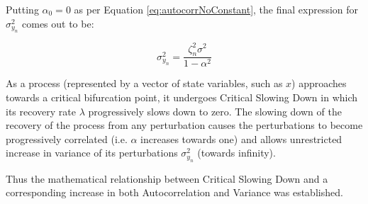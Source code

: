 Putting $\alpha_0 = 0$ as per Equation \ref{eq:autocorrNoConstant}, the final expression for $\sigma^2_{y_n}$ comes out to be:

\begin{equation}
	\label{eq:varianceFormulaNoConstant}
	\sigma^2_{y_n} = \frac{\zeta^2_{n}\sigma^2}{1-\alpha^2}
\end{equation}

As a process (represented by a vector of state variables, such as $x$) approaches towards a critical bifurcation point, it undergoes Critical Slowing Down in which its recovery rate $\lambda$ progressively slows down to zero.  The slowing down of the recovery of the process from any perturbation causes the perturbations to become progressively correlated (i.e. $\alpha$ increases towards one) and allows unrestricted increase in variance of its perturbations $\sigma^2_{y_{n}}$ (towards infinity).

Thus the mathematical relationship between Critical Slowing Down and a corresponding increase in both Autocorrelation and Variance was established. 